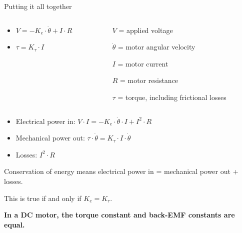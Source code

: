 \documentclass[compress]{beamer}
\begin{document}
\begin{frame}{Putting it all together}

    \begin{columns}
        \begin{column}{0.5\linewidth}

    \begin{itemize}
        \item $V = - K_e \cdot \dot\theta + I \cdot R$
        \item $\tau = K_\tau \cdot I$

    \end{itemize}
        \end{column}
        \begin{column}{0.5\linewidth}
    $V$ = applied voltage
            
    $\dot\theta$ = motor angular velocity
            
    $I$ = motor current
    
    $R$ = motor resistance
    
    $\tau$ = torque, including frictional losses
        \end{column}
    \end{columns}


    \pause 

    \begin{itemize}
        \item Electrical power in: $V \cdot I = - K_e \cdot \dot\theta \cdot I + I^2 \cdot R$
        \item Mechanical power out: $\tau \cdot \dot\theta = K_\tau \cdot I \cdot \dot\theta$
        \item Losses: $I^2 \cdot R$
    \end{itemize}

    \pause

    Conservation of energy means electrical power in = mechanical power out +
    losses.

    This is true if and only if $K_e=K_\tau$.

    \pause

    \textbf{In a DC motor, the torque constant and back-EMF constants are equal.}
\end{frame}
\end{document}
